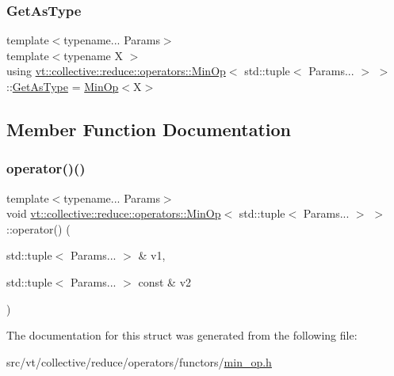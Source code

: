 \subsubsection{\texorpdfstring{Get\+As\+Type}{GetAsType}}
{\footnotesize\ttfamily template$<$typename... Params$>$ \\
template$<$typename X $>$ \\
using \hyperlink{structvt_1_1collective_1_1reduce_1_1operators_1_1_min_op}{vt\+::collective\+::reduce\+::operators\+::\+Min\+Op}$<$ std\+::tuple$<$ Params... $>$ $>$\+::\hyperlink{structvt_1_1collective_1_1reduce_1_1operators_1_1_min_op_3_01std_1_1tuple_3_01_params_8_8_8_01_4_01_4_a678d6ca487a177ee18e7bc9ab7d9d922}{Get\+As\+Type} =  \hyperlink{structvt_1_1collective_1_1reduce_1_1operators_1_1_min_op}{Min\+Op}$<$X$>$}



\subsection{Member Function Documentation}
\mbox{\label{structvt_1_1collective_1_1reduce_1_1operators_1_1_min_op_3_01std_1_1tuple_3_01_params_8_8_8_01_4_01_4_a80a0c395fdb6147263f0a86fb0be7ce2}} 
\subsubsection{\texorpdfstring{operator()()}{operator()()}}
{\footnotesize\ttfamily template$<$typename... Params$>$ \\
void \hyperlink{structvt_1_1collective_1_1reduce_1_1operators_1_1_min_op}{vt\+::collective\+::reduce\+::operators\+::\+Min\+Op}$<$ std\+::tuple$<$ Params... $>$ $>$\+::operator() (\begin{DoxyParamCaption}\item[{std\+::tuple$<$ Params... $>$ \&}]{v1,  }\item[{std\+::tuple$<$ Params... $>$ const \&}]{v2 }\end{DoxyParamCaption})\hspace{0.3cm}{\ttfamily [inline]}}



The documentation for this struct was generated from the following file\+:\begin{DoxyCompactItemize}
\item 
src/vt/collective/reduce/operators/functors/\hyperlink{min__op_8h}{min\+\_\+op.\+h}\end{DoxyCompactItemize}
